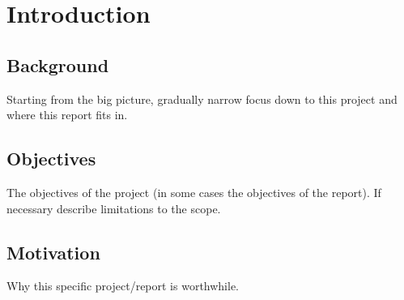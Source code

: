 \chapter{Introduction}

\section{Background}

Starting from the big picture, gradually narrow focus down to this project and where this report fits in.

\section{Objectives}

The objectives of the project (in some cases the objectives of the report). If necessary describe limitations to the scope.

\section{Motivation}

Why this specific project/report is worthwhile.